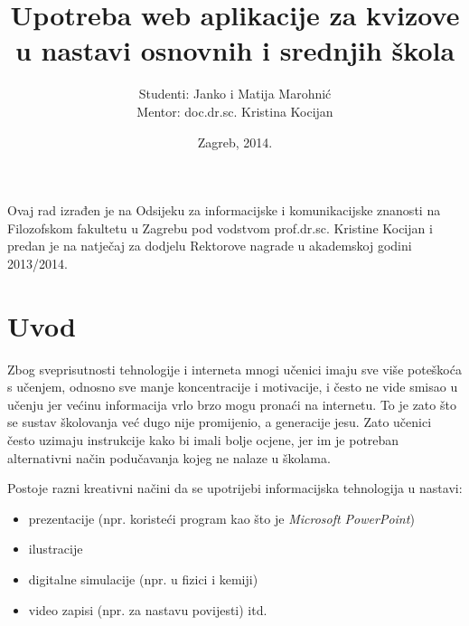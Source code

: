 \documentclass{scrreprt}
\begin{document}
\titlehead{}
\title{Upotreba web aplikacije za kvizove u nastavi osnovnih i srednjih škola}
\author{Studenti: Janko i Matija Marohnić\\Mentor: doc.dr.sc. Kristina Kocijan}
\date{Zagreb, 2014.}

\maketitle

\pagebreak

Ovaj rad izrađen je na Odsijeku za informacijske i komunikacijske znanosti na
Filozofskom fakultetu u Zagrebu pod vodstvom prof.dr.sc. Kristine Kocijan i
predan je na natječaj za dodjelu Rektorove nagrade u akademskoj godini
2013/2014.

\pagebreak

\tableofcontents

\chapter{Uvod}


Zbog sveprisutnosti tehnologije i interneta mnogi učenici imaju sve više
poteškoća s učenjem, odnosno sve manje koncentracije i motivacije, i često ne
vide smisao u učenju jer većinu informacija vrlo brzo mogu pronaći na internetu.
To je zato što se sustav školovanja već dugo nije promijenio, a generacije
jesu.\cite{perisic13} Zato učenici često uzimaju instrukcije kako bi imali bolje
ocjene, jer im je potreban alternativni način podučavanja kojeg ne nalaze u
školama.

Postoje razni kreativni načini da se upotrijebi informacijska tehnologija u
nastavi:

\begin{itemize}
  \item prezentacije (npr. koristeći program kao što je \emph{Microsoft
    PowerPoint})
  \item ilustracije
  \item digitalne simulacije (npr. u fizici i kemiji)
  \item video zapisi (npr. za nastavu povijesti) itd.
\end{itemize}
\end{document}
